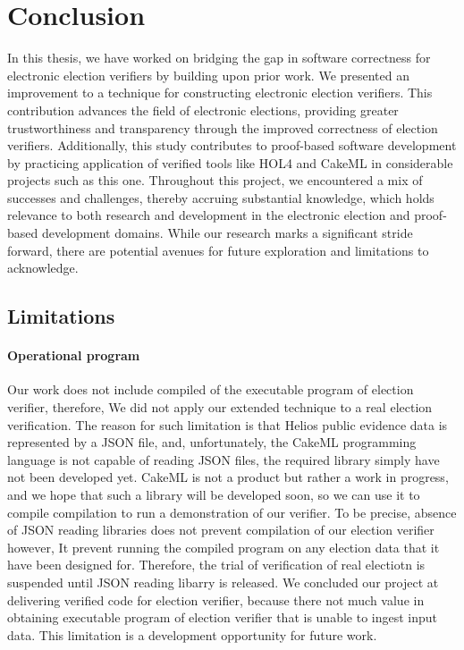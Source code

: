 \chapter{Conclusion}
In this thesis, we have worked on bridging the gap in software correctness for electronic election verifiers by building upon prior work. We presented an improvement to a technique for constructing electronic election verifiers. This contribution advances the field of electronic elections, providing greater trustworthiness and transparency through the improved correctness of election verifiers. Additionally, this study contributes to proof-based software development by practicing application of verified tools like HOL4 and CakeML in considerable projects such as this one. Throughout this project, we encountered a mix of successes and challenges, thereby accruing substantial knowledge, which holds relevance to both research and development in the electronic election and proof-based development domains. While our research marks a significant stride forward, there are potential avenues for future exploration and limitations to acknowledge.

\section{Limitations}
\subsubsection{Operational program}
Our work does not include compiled of the executable program of election verifier, therefore, We did not apply our extended technique to a real election verification. The reason for such limitation is that Helios public evidence data is represented by a JSON file, and, unfortunately, the CakeML programming language is not capable of reading JSON files, the required library simply have not been developed yet. CakeML is not a product but rather a work in progress, and we hope that such a library will be developed soon, so we can use it to compile compilation to run a demonstration of our verifier. To be precise, absence of JSON reading libraries does not prevent compilation of our election verifier however, It prevent running the compiled program on any election data that it have been designed for. Therefore, the trial of verification of real electiotn is suspended until JSON reading libarry is released. We concluded our project at delivering verified code for election verifier, because there not much value in obtaining executable program of election verifier that is unable to ingest input data. This limitation is a development opportunity for future work.

